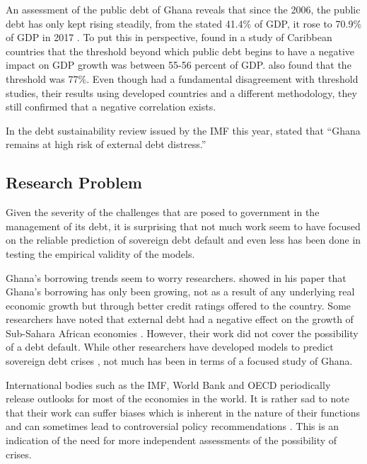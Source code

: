 \documentclass[a4paper]{article}
\begin{document}
	
	An assessment of the public debt of Ghana reveals that since the 2006, the public debt has only kept rising steadily, from the stated 41.4\% of GDP, it rose to 70.9\% of GDP in 2017 \cite{Ken2018}. To put this in perspective,  found in a study of Caribbean countries that the threshold beyond which public debt begins to have a negative impact on GDP growth was between 55-56 percent of GDP. also found that the threshold was 77\%.  Even though  had a fundamental disagreement with threshold studies, their results using developed countries and a different methodology, they still confirmed that a negative correlation exists.
	
	In the debt sustainability review issued by the IMF this year,  stated that ``Ghana remains at high risk of external debt distress.''
	\subsection{Research Problem}
	Given the severity of the challenges that are posed to government in the management of its debt, it is surprising that not much work seem to have focused on the reliable prediction of sovereign debt default  and even less has been done in testing the empirical validity of the models. 
	
	
	Ghana's borrowing trends seem to worry researchers.  showed in his paper that Ghana's borrowing has only been growing, not as a result of any underlying real economic growth but through better credit ratings offered to the country. Some researchers have noted that external debt had a negative effect on the growth of Sub-Sahara African economies \cite{Fiagbe2015, Shittu2018}. However, their work did not cover the possibility of a debt default. While other researchers have developed models to predict sovereign debt crises \cite{Marc-2008}, not much has been in terms of a focused study of Ghana.
	
	International bodies such as the IMF, World Bank and OECD periodically release outlooks for most of the economies in the world. It is rather sad to note that their work can suffer biases which is inherent in the nature of their functions \cite{Batchelor2001} and can sometimes lead to controversial policy recommendations \cite{nersisyan2010does}. This is an indication of the need for more independent assessments of the possibility of crises.
	
\end{document}
